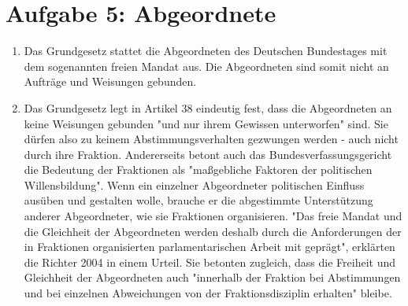 \documentclass{article}
\begin{document}
	\section*{Aufgabe 5: Abgeordnete}
	\begin{enumerate}[label=(\alph*)]
		\item Das Grundgesetz stattet die Abgeordneten des Deutschen Bundestages mit dem sogenannten freien Mandat aus. Die Abgeordneten sind somit nicht an Aufträge und Weisungen gebunden.
		\item Das Grundgesetz legt in Artikel 38 eindeutig fest, dass die Abgeordneten an keine Weisungen gebunden "und nur ihrem Gewissen unterworfen" sind. Sie dürfen also zu keinem Abstimmungsverhalten gezwungen werden - auch nicht durch ihre Fraktion. Andererseits betont auch das Bundesverfassungsgericht die Bedeutung der Fraktionen als "maßgebliche Faktoren der politischen Willensbildung". Wenn ein einzelner Abgeordneter politischen Einfluss ausüben und gestalten wolle, brauche er die abgestimmte Unterstützung anderer Abgeordneter, wie sie Fraktionen organisieren. "Das freie Mandat und die Gleichheit der Abgeordneten werden deshalb durch die Anforderungen der in Fraktionen organisierten parlamentarischen Arbeit mit geprägt", erklärten die Richter 2004 in einem Urteil. Sie betonten zugleich, dass die Freiheit und Gleichheit der Abgeordneten auch "innerhalb der Fraktion bei Abstimmungen und bei einzelnen Abweichungen von der Fraktionsdisziplin erhalten" bleibe.

\end{enumerate}
\end{document}
